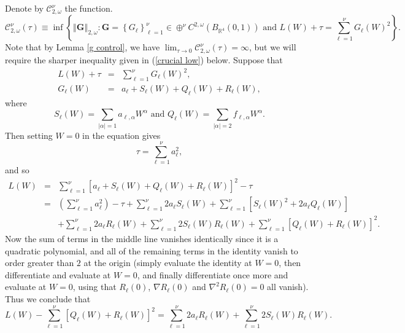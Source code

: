 \documentclass{amsart}
\theoremstyle{plain}
\numberwithin{equation}{section}
\begin{document}
Denote by $\mathcal{C}_{2,\omega }^{\nu }$ the function. 
\begin{equation*}
\mathcal{C}_{2,\omega }^{\nu }\left( \tau \right) \equiv \inf \left\{
\left\Vert \mathbf{G}\right\Vert _{2,\omega }:\mathbf{G}=\left\{ G_{\ell
}\right\} _{\ell =1}^{\nu }\in \oplus ^{\nu }C^{2,\omega }\left( B_{\mathbb{R%
}^{4}}\left( 0,1\right) \right) \text{ and }L\left( W\right) +\tau
=\sum_{\ell =1}^{\nu }G_{\ell }\left( W\right) ^{2}\right\} .
\end{equation*}%
Note that by Lemma \ref{g control}, we have $\lim_{\tau \rightarrow 0}%
\mathcal{C}_{2,\omega }^{\nu }\left( \tau \right) =\infty $, but we will
require the sharper inequality given in (\ref{crucial low}) below. Suppose
that 
\begin{eqnarray*}
L\left( W\right) +\tau &=&\sum_{\ell =1}^{\nu }G_{\ell }\left( W\right) ^{2},
\\
G_{\ell }\left( W\right) &=&a_{\ell }+S_{\ell }\left( W\right) +Q_{\ell
}\left( W\right) +R_{\ell }\left( W\right) ,
\end{eqnarray*}%
where%
\begin{equation*}
S_{\ell }\left( W\right) =\sum_{\left\vert \alpha \right\vert =1}a_{\ell
,\alpha }W^{\alpha }\text{ and }Q_{\ell }\left( W\right) =\sum_{\left\vert
\alpha \right\vert =2}f_{\ell ,\alpha }W^{\alpha }.
\end{equation*}%
Then setting $W=0$ in the equation gives 
\begin{equation*}
\tau =\sum_{\ell =1}^{\nu }a_{\ell }^{2},
\end{equation*}%
and so%
\begin{eqnarray*}
L\left( W\right) &=&\sum_{\ell =1}^{\nu }\left[ a_{\ell }+S_{\ell }\left(
W\right) +Q_{\ell }\left( W\right) +R_{\ell }\left( W\right) \right]
^{2}-\tau \\
&=&\left( \sum_{\ell =1}^{\nu }a_{\ell }^{2}\right) -\tau +\sum_{\ell
=1}^{\nu }2a_{\ell }S_{\ell }\left( W\right) +\sum_{\ell =1}^{\nu }\left[
S_{\ell }\left( W\right) ^{2}+2a_{\ell }Q_{\ell }\left( W\right) \right] \\
&&+\sum_{\ell =1}^{\nu }2a_{\ell }R_{\ell }\left( W\right) +\sum_{\ell
=1}^{\nu }2S_{\ell }\left( W\right) R_{\ell }\left( W\right) +\sum_{\ell
=1}^{\nu }\left[ Q_{\ell }\left( W\right) +R_{\ell }\left( W\right) \right]
^{2}.
\end{eqnarray*}%
Now the sum of terms in the middle line vanishes identically since it is a
quadratic polynomial, and all of the remaining terms in the identity vanish
to order greater than $2$ at the origin (simply evaluate the identity at $%
W=0 $, then differentiate and evaluate at $W=0$, and finally differentiate
once more and evaluate at $W=0$, using that $R_{\ell }\left( 0\right) $, $%
\nabla R_{\ell }\left( 0\right) $ and $\nabla ^{2}R_{\ell }\left( 0\right)
=0 $ all vanish). Thus we conclude that%
\begin{equation}
L\left( W\right) -\sum_{\ell =1}^{\nu }\left[ Q_{\ell }\left( W\right)
+R_{\ell }\left( W\right) \right] ^{2}=\sum_{\ell =1}^{\nu }2a_{\ell
}R_{\ell }\left( W\right) +\sum_{\ell =1}^{\nu }2S_{\ell }\left( W\right)
R_{\ell }\left( W\right) .  \label{conclude}
\end{equation}
\end{document}
